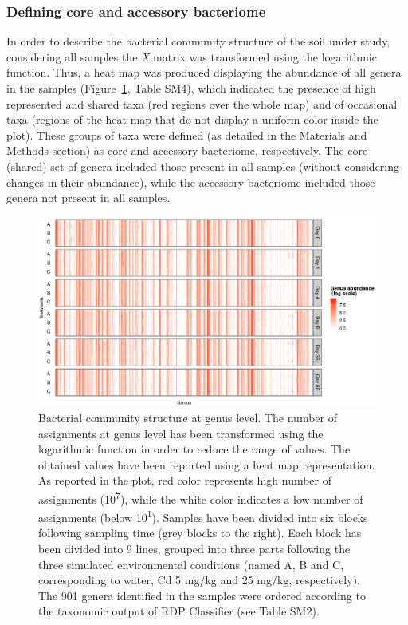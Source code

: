 \subsubsection{Defining core and accessory bacteriome}
In order to describe the bacterial community structure of the soil under study, considering all samples the \textit{X} matrix was transformed using the logarithmic function. Thus, a heat map was produced displaying the abundance of all genera in the samples (Figure~\ref{fig:3rom}, Table SM4), which indicated the presence of high represented and shared taxa (red regions over the whole map) and of occasional taxa (regions of the heat map that do not display a uniform color inside the plot). These groups of taxa were defined (as detailed in the Materials and Methods section) as core and accessory bacteriome, respectively. The core (shared) set of genera included those present in all samples (without considering changes in their abundance), while the accessory bacteriome included those genera not present in all samples.\\
\begin{figure}[!tb]
	\centering
	\includegraphics[width=1\textwidth]{./figures/Chapter_3/Fig3.eps}
  	\caption{Bacterial community structure at genus level. The number of assignments at genus level has been transformed using the logarithmic function in order to reduce the range of values. The obtained values have been reported using a heat map representation. As reported in the plot, red color represents high number of assignments (10\textsuperscript{7}), while the white color indicates a low number of assignments (below 10\textsuperscript{1}). Samples have been divided into six blocks following sampling time (grey blocks to the right). Each block has been divided into 9 lines, grouped into three parts following the three simulated environmental conditions (named A, B and C, corresponding to water, Cd 5 mg/kg and 25 mg/kg, respectively). The 901 genera identified in the samples were ordered according to the taxonomic output of RDP Classifier (see Table SM2). \label{fig:3rom}}
\end{figure}
